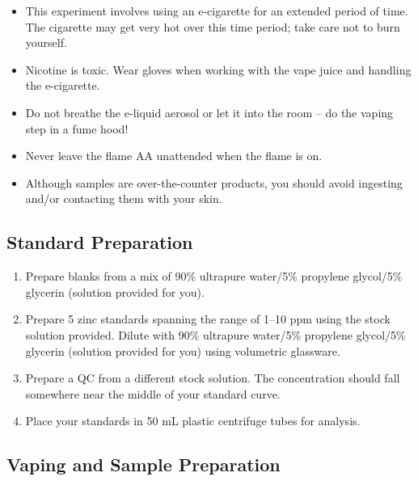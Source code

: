 \documentclass[]{tufte-book}
\providecommand{\tightlist}{%
  \setlength{\itemsep}{0pt}\setlength{\parskip}{0pt}}
\begin{document}
\begin{itemize}
\tightlist
\item
  This experiment involves using an e-cigarette for an extended period of time. The cigarette may get very hot over this time period; take care not to burn yourself.\\
\item
  Nicotine is toxic. Wear gloves when working with the vape juice and handling the e-cigarette.\\
\item
  Do not breathe the e-liquid aerosol or let it into the room -- do the vaping step in a fume hood!\\
\item
  Never leave the flame AA unattended when the flame is on.\\
\item
  Although samples are over-the-counter products, you should avoid ingesting and/or contacting them with your skin.
\end{itemize}

\hypertarget{standard-preparation}{%
\subsection{Standard Preparation}\label{standard-preparation}}

\begin{enumerate}
\def\labelenumi{\arabic{enumi}.}
\tightlist
\item
  Prepare blanks from a mix of 90\% ultrapure water/5\% propylene glycol/5\% glycerin (solution provided for you).
\item
  Prepare 5 zinc standards spanning the range of 1--10 ppm using the stock solution provided. Dilute with 90\% ultrapure water/5\% propylene glycol/5\% glycerin (solution provided for you) using volumetric glassware.
\item
  Prepare a QC from a different stock solution. The concentration should fall somewhere near the middle of your standard curve.
\item
  Place your standards in 50 mL plastic centrifuge tubes for analysis.
\end{enumerate}

\hypertarget{vaping-and-sample-preparation}{%
\subsection{Vaping and Sample Preparation}\label{vaping-and-sample-preparation}}
\end{document}
